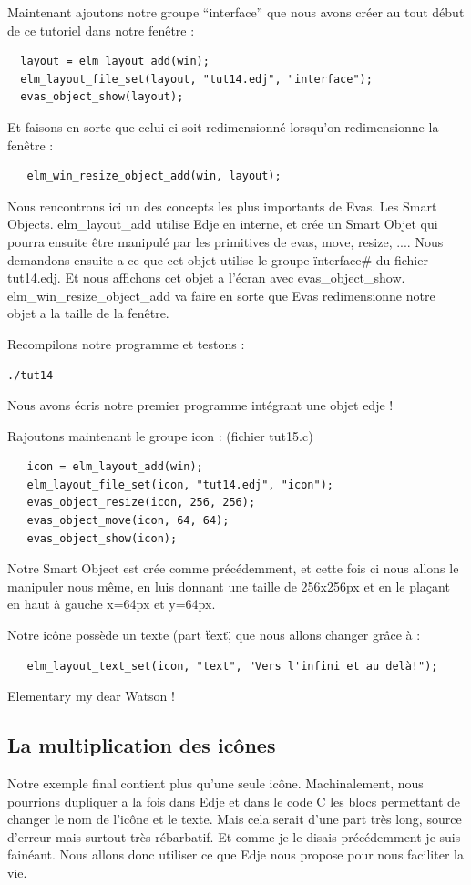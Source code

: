 \documentclass[a4paper]{efr}
\begin{document}
Maintenant ajoutons notre groupe ``interface'' que nous avons créer au tout
début de ce tutoriel dans notre fenêtre :

\begin{lstlisting}
  layout = elm_layout_add(win);
  elm_layout_file_set(layout, "tut14.edj", "interface");
  evas_object_show(layout);
\end{lstlisting}

Et faisons en sorte que celui-ci soit redimensionné lorsqu'on redimensionne la
fenêtre :
\begin{lstlisting}
   elm_win_resize_object_add(win, layout);
\end{lstlisting}

Nous rencontrons ici un des concepts les plus importants de Evas. Les Smart
Objects. elm\_layout\_add utilise Edje en interne, et crée un Smart Objet qui
pourra ensuite être manipulé par les primitives de evas, move, resize, ....
Nous demandons ensuite a ce que cet objet utilise le groupe \"interface\# du
fichier tut14.edj. Et nous affichons cet objet a l'écran avec
evas\_object\_show. elm\_win\_resize\_object\_add va faire en sorte que Evas
redimensionne notre objet a la taille de la fenêtre.

Recompilons notre programme et testons :
\begin{lstlisting}
./tut14
\end{lstlisting}

Nous avons écris notre premier programme intégrant une objet edje !

Rajoutons maintenant le groupe icon : (fichier tut15.c)
\begin{lstlisting}
   icon = elm_layout_add(win);
   elm_layout_file_set(icon, "tut14.edj", "icon");
   evas_object_resize(icon, 256, 256);
   evas_object_move(icon, 64, 64);
   evas_object_show(icon);
\end{lstlisting}

Notre Smart Object est crée comme précédemment, et cette fois ci nous allons
le manipuler nous même, en luis donnant une taille de 256x256px et en le
plaçant en haut à gauche x=64px et y=64px.

Notre icône possède un texte (part \"text\", que nous allons changer grâce à :
\begin{lstlisting}
   elm_layout_text_set(icon, "text", "Vers l'infini et au delà!");
\end{lstlisting}

Elementary my dear Watson !

\subsection{La multiplication des icônes}
Notre exemple final contient plus qu'une seule icône. Machinalement, nous
pourrions dupliquer a la fois dans Edje et dans le code C les blocs permettant
de changer le nom de l'icône et le texte. Mais cela serait d'une part très long,
source d'erreur mais surtout très rébarbatif. Et comme je le disais précédemment
je suis fainéant. Nous allons donc utiliser ce que Edje nous propose pour nous
faciliter la vie.
\end{document}
